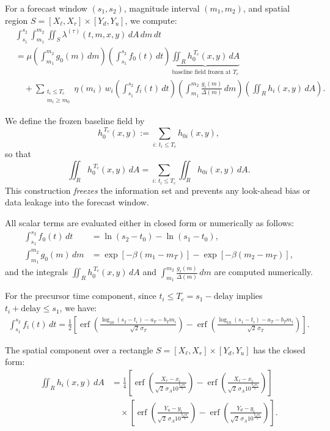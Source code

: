 \documentclass[linenum,doublespace,onecolumn]{SSA-SRL}
\theoremstyle{lemma}
\begin{document}
For a forecast window $(s_1, s_2)$, magnitude interval $(m_1, m_2)$, and spatial region $S = [X_\ell, X_r] \times [Y_d, Y_u]$, we compute:
\begin{align*}
    &\int_{s_1}^{s_2} \!\int_{m_1}^{m_2} \!\iint_S \lambda^{(\tau)}(t, m, x, y)\, dA\, dm\, dt \\[1ex]
    &= \mu \left( \int_{m_1}^{m_2} g_0(m)\, dm \right) \left( \int_{s_1}^{s_2} f_0(t)\, dt \right)
       \underbrace{\iint_R h_0^{\,T_c}(x, y)\, dA}_{\text{baseline field frozen at } T_c} \\[1ex]
    &\quad + \sum_{\substack{t_i \le T_c\\ m_i \ge m_0}} \eta(m_i)\, w_i
       \left( \int_{s_1}^{s_2} f_i(t)\, dt \right)
       \left( \int_{m_1}^{m_2} \tfrac{g_i(m)}{\Delta(m)}\, dm \right)
       \left( \iint_R h_i(x, y)\, dA \right).
\end{align*}

We define the frozen baseline field by
\[
h_0^{\,T_c}(x, y) := \sum_{i:\, t_i \le T_c} h_{0i}(x, y),
\]
so that
\[
\iint_R h_0^{\,T_c}(x, y)\, dA = \sum_{i:\, t_i \le T_c} \iint_R h_{0i}(x, y)\, dA.
\]
This construction \emph{freezes} the information set and prevents any look-ahead bias or data leakage into the forecast window.

\smallskip
All scalar terms are evaluated either in closed form or numerically as follows:
\begin{align*}
\int_{s_1}^{s_2} f_0(t)\, dt &= \ln(s_2 - t_0) - \ln(s_1 - t_0), \\
\int_{m_1}^{m_2} g_0(m)\, dm &= \exp\!\left[-\beta(m_1 - m_T)\right] - \exp\!\left[-\beta(m_2 - m_T)\right],
\end{align*}
and the integrals $\iint_R h_0^{\,T_c}(x, y)\, dA$ and $\int_{m_1}^{m_2} \tfrac{g_i(m)}{\Delta(m)}\, dm$ are computed numerically.

\smallskip
For the precursor time component, since $t_i \le T_c = s_1 - \mathrm{delay}$ implies $t_i + \mathrm{delay} \le s_1$, we have:
\begin{align*}
\int_{s_1}^{s_2} f_i(t)\, dt
= \frac{1}{2} \left[
  \operatorname{erf}\!\left( \frac{\log_{10}(s_2 - t_i) - a_T - b_T m_i}{\sqrt{2}\, \sigma_T} \right)
- \operatorname{erf}\!\left( \frac{\log_{10}(s_1 - t_i) - a_T - b_T m_i}{\sqrt{2}\, \sigma_T} \right)
\right].
\end{align*}

The spatial component over a rectangle $S = [X_\ell, X_r] \times [Y_d, Y_u]$ has the closed form:
\begin{align*}
\iint_R h_i(x, y)\, dA
&= \frac{1}{4}
\left[
  \operatorname{erf}\!\left( \frac{X_r - x_i}{\sqrt{2}\, \sigma_A 10^{\frac{b_A m_i}{2}}} \right)
- \operatorname{erf}\!\left( \frac{X_\ell - x_i}{\sqrt{2}\, \sigma_A 10^{\frac{b_A m_i}{2}}} \right)
\right] \\
&\quad \times
\left[
  \operatorname{erf}\!\left( \frac{Y_u - y_i}{\sqrt{2}\, \sigma_A 10^{\frac{b_A m_i}{2}}} \right)
- \operatorname{erf}\!\left( \frac{Y_d - y_i}{\sqrt{2}\, \sigma_A 10^{\frac{b_A m_i}{2}}} \right)
\right].
\end{align*}
\end{document}
